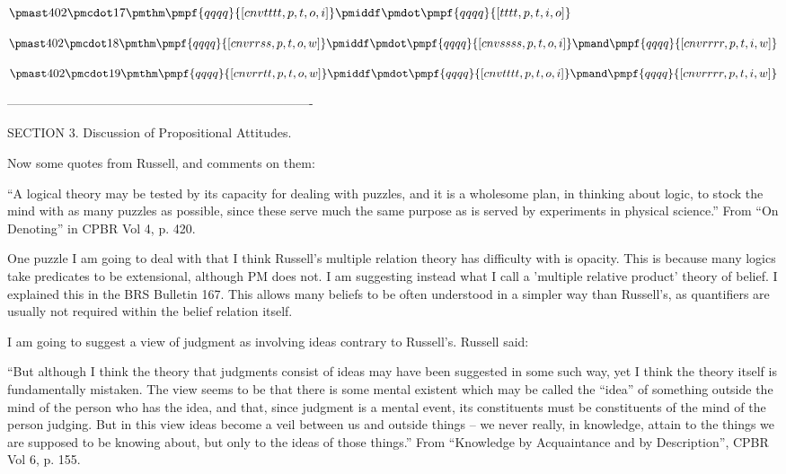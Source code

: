 \documentclass[12pt]{article}
\begin{document}
$\pmast 402 \pmcdot 17 \pmthm \pmpf{qqqq}{[cnvtttt, p, t, o, i]} \pmiddf \pmdot \pmpf{qqqq}{[tttt, p, t, i, o]} $

$\pmast 402 \pmcdot 18 \pmthm \pmpf{qqqq}{[cnvrrss, p, t, o, w]} \pmiddf \pmdot \pmpf{qqqq}{[cnvssss, p, t, o, i]} \pmand \pmpf{qqqq}{[cnvrrrr, p, t, i, w]} $

$\pmast 402 \pmcdot 19 \pmthm \pmpf{qqqq}{[cnvrrtt, p, t, o, w]} \pmiddf \pmdot \pmpf{qqqq}{[cnvtttt, p, t, o, i]} \pmand \pmpf{qqqq}{[cnvrrrr, p, t, i, w]} $

-------------------------------------------------------------------------

SECTION 3. Discussion of Propositional Attitudes.

Now some quotes from Russell, and comments on them:

“A logical theory may be tested by its capacity for dealing with puzzles, and it is a wholesome plan, in thinking about logic, to stock the mind with as many puzzles as possible, since these serve much the same purpose as is served by experiments in physical science.” From “On Denoting” in CPBR Vol 4, p. 420.

One puzzle I am going to deal with that I think Russell's multiple relation theory has difficulty with is opacity. This is because many logics take predicates to be extensional, although PM does not. I am suggesting instead what I call a 'multiple relative product' theory of belief. I explained this in the BRS Bulletin 167. This allows many beliefs to be often understood in a simpler way than Russell's, as quantifiers are usually not required within the belief relation itself. 

I am going to suggest a view of judgment as involving ideas contrary to Russell’s. Russell said:

“But although I think the theory that judgments consist of ideas may have been suggested in some such way, yet I think the theory itself is fundamentally mistaken. The view seems to be that there is some mental existent which may be called the “idea” of something outside the mind of the person who has the idea, and that, since judgment is a mental event, its constituents must be constituents of the mind of the person judging. But in this view ideas become a veil between us and outside things – we never really, in knowledge, attain to the things we are supposed to be knowing about, but only to the ideas of those things.”   From “Knowledge by Acquaintance and by Description”, CPBR Vol 6, p. 155.
\end{document}
